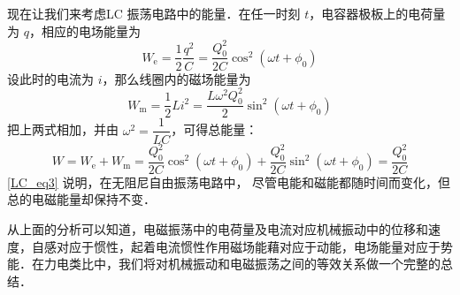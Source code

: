 现在让我们来考虑LC 振荡电路中的能量．在任一时刻 $t$，电容器极板上的电荷量为 $q$，相应的电场能量为
\begin{equation}
W_{\mathrm e}=\frac{1}{2} \frac{q^{2}}{C}=\frac{Q_{0}^{2}}{2 C} \cos ^{2}\left(\omega t+\phi_{0}\right)
\end{equation}
设此时的电流为 $i$，那么线圈内的磁场能量为
\begin{equation}
W_{\mathrm{m}}=\frac{1}{2} L i^{2}=\frac{L \omega^{2} Q_{0}^{2}}{2} \sin ^{2}\left(\omega t+\phi_{0}\right)
\end{equation}
把上两式相加，并由 $\omega^{2}=\dfrac{1}{L C}$，可得总能量：
\begin{equation} \label{LC_eq3}
W=W_{\mathrm{e}}+W_{\mathrm{m}}=\frac{Q_{0}^{2}}{2 C} \cos ^{2}\left(\omega t+\phi_{0}\right)+\frac{Q_{0}^{2}}{2 C} \sin ^{2}\left(\omega t+\phi_{0}\right)=\frac{Q_{0}^{2}}{2 C}
\end{equation}
\autoref{LC_eq3} 说明，在无阻尼自由振荡电路中， 尽管电能和磁能都随时间而变化，但总的电磁能量却保持不变．

从上面的分析可以知道，电磁振荡中的电荷量及电流对应机械振动中的位移和速度，自感对应于惯性，起着电流惯性作用磁场能藉对应于动能，电场能量对应于势能．在力电类比中，我们将对机械振动和电磁振荡之间的等效关系做一个完整的总结．
